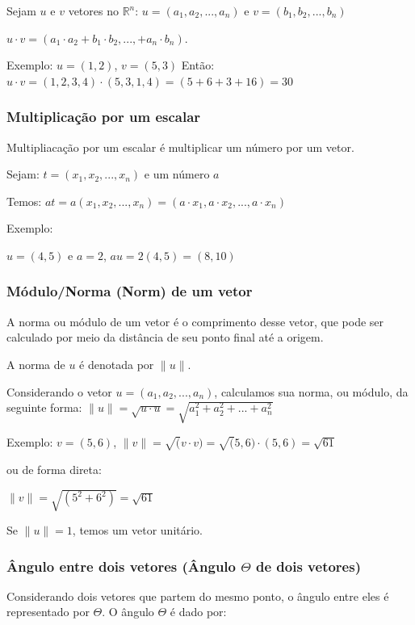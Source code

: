 \documentclass[12pt]{article}
\begin{document}
Sejam \(u\) e \(v\) vetores no \(\mathbb{R}^n\): \(u=(a_{1}, a_{2},...,a_{n})\) e \(v=(b_{1}, b_{2},...,b_{n})\)

\(u \cdot v = (a_{1} \cdot a_{2} + b_{1} \cdot b_{2} ,..., + a_{n} \cdot b_{n})\).

Exemplo: \(u = (1,2)\), \(v = (5, 3)\)
Então: \(u \cdot v = (1, 2, 3, 4) \cdot (5, 3, 1, 4) = (5 + 6 + 3 + 16) = 30\)

\subsubsection{Multiplicação por um escalar}

Multipliacação por um escalar é multiplicar um número por um vetor.

Sejam: \(t = (x_{1}, x_{2}, ..., x_{n})\) e um número \(a\)

Temos: \(at = a(x_{1}, x_{2}, ..., x_{n}) = (a \cdot x_{1}, a \cdot x_{2}, ..., a \cdot x_{n})\)

Exemplo:

\(u = (4, 5)\) e \(a = 2\), \(au = 2(4, 5) = (8, 10)\)

\subsubsection{Módulo/Norma (Norm) de um vetor}

A norma ou módulo de um vetor é o comprimento desse vetor, que pode ser calculado por meio da distância de seu ponto final até a origem.

A norma de \( u \) é denotada por \( \| u \| \).

Considerando o vetor \(u = (a_{1}, a_{2}, ..., a_{n})\), calculamos sua norma, ou módulo, da seguinte forma\cite{lipschutz-algebra, anton2012algebra}: \( \|u\| = \sqrt{u \cdot u} = \sqrt{a_{1}^2 + a_{2}^2 + ... + a_{n}^2} \) 

Exemplo: \(v = (5, 6)\), \(\|v\| = \sqrt(v \cdot v) = \sqrt(5,6) \cdot (5,6) = \sqrt{61}\)

ou de forma direta:

\(\|v\| = \sqrt{(5^2+6^2)} = \sqrt{61}\)


Se \(\|u\| = 1\), temos um vetor unitário.

\subsubsection{Ângulo entre dois vetores (Ângulo $\Theta$ de dois vetores)}

Considerando dois vetores que partem do mesmo ponto, o ângulo entre eles é representado por $\Theta$. O ângulo $\Theta$ é dado por:
\end{document}
